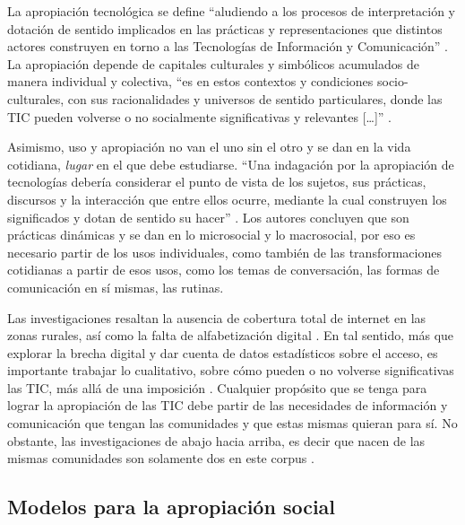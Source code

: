 \documentclass[spanish]{textolivre}
\begin{document}
La apropiación tecnológica se define “aludiendo a los procesos de interpretación y dotación de sentido implicados en las prácticas y representaciones que distintos actores construyen en torno a las Tecnologías de Información y Comunicación” \cite[p.~3]{benitz_laghi_lo_2013}. La apropiación depende de capitales culturales y simbólicos acumulados de manera individual y colectiva, “es en estos contextos y condiciones socio-culturales, con sus racionalidades y universos de sentido particulares, donde las TIC pueden volverse o no socialmente significativas y relevantes […]” \cite[p.~3]{benitz_laghi_lo_2013}.

Asimismo, uso y apropiación no van el uno sin el otro y se dan en la vida cotidiana, \textit{lugar} en el que debe estudiarse. “Una indagación por la apropiación de tecnologías debería considerar el punto de vista de los sujetos, sus prácticas, discursos y la interacción que entre ellos ocurre, mediante la cual construyen los significados y dotan de sentido su hacer” \cite[p.~5]{alvarez_cadavid_apropiacion_2011}. Los autores concluyen que son prácticas dinámicas y se dan en lo microsocial y lo macrosocial, por eso es necesario partir de los usos individuales, como también de las transformaciones cotidianas a partir de esos usos, como los temas de conversación, las formas de comunicación en sí mismas, las rutinas. 

Las investigaciones resaltan la ausencia de cobertura total de internet en las zonas rurales, así como la falta de alfabetización digital \cite{duarte_metodologipara_2014,castro_hidalgo_impacto_2014,barbosa_trigos_propuesta_2016,sanchez_davila_nuevas_2018,zapata_-_cardenas_ruralidad_2015}. En tal sentido, más que explorar la brecha digital y dar cuenta de datos estadísticos sobre el acceso, es importante trabajar lo cualitativo, sobre cómo pueden o no volverse significativas las TIC, más allá de una imposición \cite{benitz_laghi_lo_2013}. Cualquier propósito que se tenga para lograr la apropiación de las TIC debe partir de las necesidades de información y comunicación que tengan las comunidades y que estas mismas quieran para sí. No obstante, las investigaciones de abajo hacia arriba, es decir que nacen de las mismas comunidades son solamente dos en este corpus \cite{yasya_rural_2020,ye_citizen-led_2021}.

\subsection{Modelos para la apropiación social}
\end{document}
